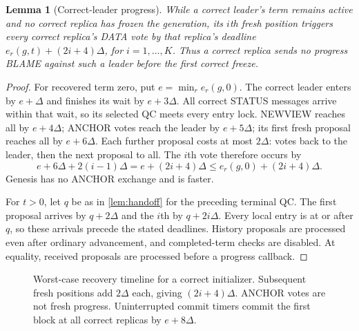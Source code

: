 \documentclass[11pt,a4paper]{article}
\newtheorem{lemma}[lemma]{Lemma}
\begin{document}
\begin{lemma}[Correct-leader progress]
\label{lem:progress}
While a correct leader's term remains active and no correct replica has
frozen the generation, its $i$th fresh position triggers every correct
replica's DATA vote by that replica's deadline
$e_r(g,t)+(2i+4)\Delta$, for $i=1,\ldots,K$.
Thus a correct replica sends no progress BLAME against such a leader
before the first correct freeze.
\end{lemma}
\begin{proof}
For recovered term zero, put $e=\min_r e_r(g,0)$. The correct leader enters
by $e+\Delta$ and finishes its wait by $e+3\Delta$. All correct STATUS
messages arrive within that wait, so its selected QC meets every entry
lock. NEWVIEW reaches all by $e+4\Delta$; ANCHOR votes reach the leader
by $e+5\Delta$; its first fresh proposal reaches all by $e+6\Delta$.
Each further proposal costs at most $2\Delta$: votes back to the leader,
then the next proposal to all. The $i$th vote therefore occurs by
\[
 e+6\Delta+2(i-1)\Delta=e+(2i+4)\Delta
 \le e_r(g,0)+(2i+4)\Delta.
\]
Genesis has no ANCHOR exchange and is faster.

For $t>0$, let $q$ be as in \cref{lem:handoff} for the preceding terminal
QC. The first proposal arrives by $q+2\Delta$ and the $i$th by
$q+2i\Delta$. Every local entry is at or after $q$, so these arrivals
precede the stated deadlines. History proposals are processed even after
ordinary advancement, and completed-term checks are disabled. At equality,
received proposals are processed before a progress callback.
\end{proof}

\begin{figure}[htbp]\centering
{}
\caption{Worst-case recovery timeline for a correct initializer. Subsequent
fresh positions add $2\Delta$ each, giving $(2i+4)\Delta$. ANCHOR votes
are not fresh progress. Uninterrupted commit timers commit the first
block at all correct replicas by $e+8\Delta$.}
\label{fig:recovery}
\end{figure}
\FloatBarrier
\end{document}
